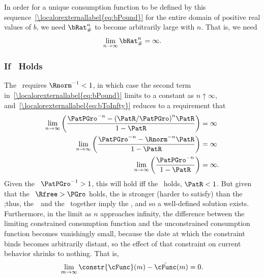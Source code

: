 \documentclass[\econtexRoot/BufferStockTheory]{subfiles}
\begin{document}
In order for a unique consumption function to be defined by this sequence~\eqref{\localorexternallabel{eq:bPound}} for the entire domain of positive real values of $b$, we need $\bRat_{\#}^{n}$ to become arbitrarily large with $n$.  That is, we need
\begin{equation}\begin{gathered}\begin{aligned}
  \lim_{n \rightarrow \infty} \bRat_{\#}^{n} = \infty. \label{eq:bToInfty}
\end{aligned}\end{gathered}\end{equation}

\subsubsection{If \FHWC~Holds}
The \FHWC~requires $\Rnorm^{-1} < 1$, in which case the second term in~\eqref{\localorexternallabel{eq:bPound}} limits to a constant as $n \uparrow \infty$, and~\eqref{\localorexternallabel{eq:bToInfty}} reduces to a requirement that
\begin{eqnarray*}
  \lim_{n \rightarrow \infty} \left(\frac{\PatPGro^{-n}-{(\PatR/\PatPGro)}^{n}\PatR}{1-\PatR}\right)  & = \infty
  \\  \lim_{n \rightarrow \infty} \left(\frac{\PatPGro^{-n}-\Rnorm^{-n}\PatR}{1-\PatR}\right)  & = \infty
  \\  \lim_{n \rightarrow \infty} \left(\frac{\PatPGro^{-n}}{1-\PatR}\right)  & = \infty.
\end{eqnarray*}
Given the \GICRaw~$\PatPGro^{-1}>1$, this will hold iff the \RIC~holds, $\PatR < 1$.  But given that the \FHWC~$\Rfree > \PGro$ holds, the {\GICRaw} is stronger (harder to satisfy) than the \RIC;\@ thus, the~\FHWC~and the \GICRaw~together imply the \RIC, and so a well-defined solution exists.  Furthermore, in the limit as $n$ approaches infinity, the difference between the limiting constrained consumption function and the unconstrained consumption function becomes vanishingly small, because the date at which the constraint binds becomes arbitrarily distant, so the effect of that constraint on current behavior shrinks to nothing.  That is,
\begin{equation}\begin{gathered}\begin{aligned}
  \lim_{m \rightarrow \infty}\constr{\cFunc}(m) - \bar{\cFunc}(m) = 0.
\end{aligned}\end{gathered}\end{equation}
\end{document}
